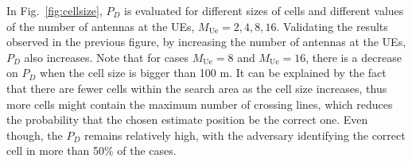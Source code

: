\documentclass[conference,twocolumn,a4paper]{IEEEtran}
\theoremstyle{remark} \newtheorem{remark}{Remark}
\begin{document}

In Fig.~\ref{fig:cellsize}, $P_D$ is evaluated for different sizes of cells and different values of the number of antennas at the UEs, $M_{\mathrm{Ue}}$$=$$2,4, 8, 16$. Validating the results observed in the previous figure, by increasing the number of antennas at the UEs, $P_D$ also increases. Note that for cases $M_{\mathrm{Ue}}$$=$$8$ and $M_{\mathrm{Ue}}$$=$$16$, there is a decrease on $P_D$ when the cell size is bigger than 100 m. It can be explained by the fact that there are fewer cells within the search area as the cell size increases, thus more cells might contain the maximum number of crossing lines, which reduces the probability that the chosen estimate position be the correct one. Even though, the $P_D$ remains relatively high, with the adversary identifying the correct cell in more than 50\% of the cases.

\end{document}
